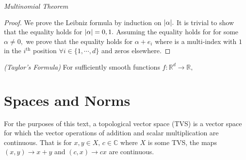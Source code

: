\begin{theorem}
    \textit{Multinomial Theorem}
\end{theorem}
\begin{theorem}
\end{theorem}
\begin{proof}
We prove the Leibniz formula by induction on $\abs{\alpha}.$ It is trivial to show that the equality holds for $\abs{\alpha}=0,1.$ Assuming the equality holds for for some $\alpha\neq0,$ we prove that the equality holds for $\alpha+e_i$ where is a multi-index with $1$ in the $i^\mathrm{th}$ position $\forall i\in\{1,\cdots,d\}$ and zeros elsewhere.

    
\end{proof}

\begin{theorem}
    \textit{(Taylor's Formula)} For sufficiently smooth functions $f:\mathbb{R}^d\rightarrow\mathbb{R},$
\end{theorem}

\section{Spaces and Norms}
For the purposes of this text, a topological vector space (TVS) is a vector space for which the vector operations of addition and scalar multiplication are continuous. That is for $x,y\in X,\,c\in\mathbb{C}$ where $X$ is some TVS, the maps $(x,y)\rightarrow x+y$ and $(c,x)\rightarrow cx$ are continuous.

